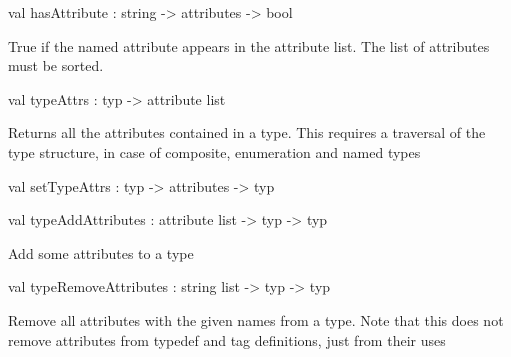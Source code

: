 \documentclass[11pt]{article}
\begin{document}
\label{val:Cil.hasAttribute}\begin{ocamldoccode}
val hasAttribute : string -> attributes -> bool
\end{ocamldoccode}
\begin{ocamldocdescription}
True if the named attribute appears in the attribute list. The list of
    attributes must be sorted.


\end{ocamldocdescription}




\label{val:Cil.typeAttrs}\begin{ocamldoccode}
val typeAttrs : typ -> attribute list
\end{ocamldoccode}
\begin{ocamldocdescription}
Returns all the attributes contained in a type. This requires a traversal 
    of the type structure, in case of composite, enumeration and named types


\end{ocamldocdescription}




\label{val:Cil.setTypeAttrs}\begin{ocamldoccode}
val setTypeAttrs : typ -> attributes -> typ
\end{ocamldoccode}




\label{val:Cil.typeAddAttributes}\begin{ocamldoccode}
val typeAddAttributes : attribute list -> typ -> typ
\end{ocamldoccode}
\begin{ocamldocdescription}
Add some attributes to a type


\end{ocamldocdescription}




\label{val:Cil.typeRemoveAttributes}\begin{ocamldoccode}
val typeRemoveAttributes : string list -> typ -> typ
\end{ocamldoccode}
\begin{ocamldocdescription}
Remove all attributes with the given names from a type. Note that this
    does not remove attributes from typedef and tag definitions, just from 
    their uses


\end{ocamldocdescription}
\end{document}
